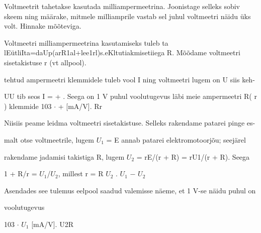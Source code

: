
Voltmeetrit tahetakse kasutada milliampermeetrina. Joonistage selleks sobiv skeem ning määrake, mitmele milliamprile vastab sel juhul voltmeetri näidu üks volt. Hinnake mõõteviga.

\hint

\solu
Voltmeetri milliampermeetrina kasutamiseks tuleb ta lEütliIta=daUp(arR1al+lee1rl)s.eKltutiakmisetiiega R. Mõõdame voltmeetri sisetakistuse r (vt allpool).

tehtud ampermeetri klemmidele tuleb vool I ning voltmeetri lugem on U siis keh-

UU tib seos I = + . Seega on 1 V puhul voolutugevus läbi meie ampermeetri R( r ) klemmide 103 $\cdot$ + [mA/V]. Rr

Niisiis peame leidma voltmeetri sisetakistuse. Selleks rakendame patarei pinge es-

malt otse voltmeetrile, lugem $U_1$ = E annab patarei elektromotoorjõu; seejärel

rakendame jadamisi takistiga R, lugem $U_2$ = rE/(r + R) = rU1/(r + R). Seega

1 + R/r = $U_1$/$U_2$, millest r = R $U_2$ . $U_1$ $-$ $U_2$

Asendades see tulemus eelpool saadud valemisse näeme, et 1 V-se näidu puhul on

voolutugevus

103 $\cdot$ $U_1$ [mA/V]. U2R
\probend
